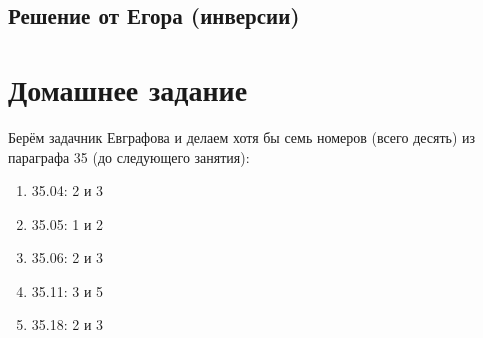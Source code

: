 	\subsection{Решение от Егора (инверсии)}
		\TODO

\section{Домашнее задание}
	Берём задачник Евграфова и делаем хотя бы семь номеров (всего десять) из параграфа 35 (до следующего занятия):
	\begin{enumerate}
		\item 35.04: 2 и 3
		\item 35.05: 1 и 2
		\item 35.06: 2 и 3
		\item 35.11: 3 и 5
		\item 35.18: 2 и 3
	\end{enumerate}
